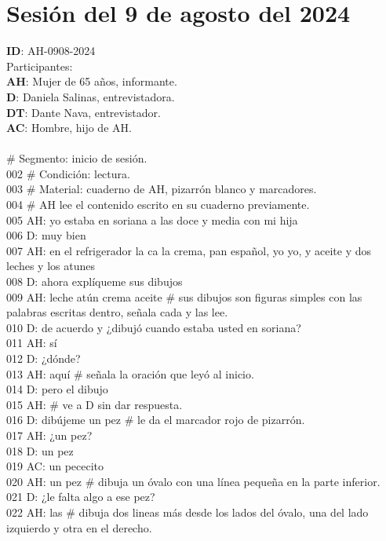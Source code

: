 \section{Sesión del 9 de agosto del 2024}
\noindent
\textbf{ID}: AH-0908-2024\\
Participantes:\\
\textbf{AH}: Mujer de 65 años, informante.\\
\textbf{D}: Daniela Salinas, entrevistadora.\\
\textbf{DT}: Dante Nava, entrevistador.\\
\textbf{AC}: Hombre, hijo de AH.\\
\\
 \# Segmento: inicio de sesión.\\
002 \# Condición: lectura.\\
003 \# Material: cuaderno de AH, pizarrón blanco y marcadores.\\
004 \# AH lee el contenido escrito en su cuaderno previamente.\\
005 AH: yo estaba en soriana a las doce y media con mi hija\\
006 D: muy bien\\
007 AH: en el refrigerador la ca la crema, pan español, yo yo, y aceite y dos leches y los atunes\\
008 D: ahora explíqueme sus dibujos\\
009 AH: leche atún crema aceite \# sus dibujos son figuras simples con las palabras escritas dentro, señala cada y las lee.\\
010 D: de acuerdo y ¿dibujó cuando estaba usted en soriana?\\
011 AH: sí\\
012 D: ¿dónde?\\
013 AH: aquí \# señala la oración que leyó al inicio.\\
014 D: pero el dibujo\\
015 AH: \# ve a D sin dar respuesta.\\
016 D: dibújeme un pez \# le da el marcador rojo de pizarrón.\\
017 AH: ¿un pez?\\
018 D: un pez\\
019 AC: un pececito\\
020 AH: un pez \# dibuja un óvalo con una línea pequeña en la parte inferior.\\
021 D: ¿le falta algo a ese pez?\\
022 AH: las \# dibuja dos lineas más desde los lados del óvalo, una del lado izquierdo y otra en el derecho.\\
